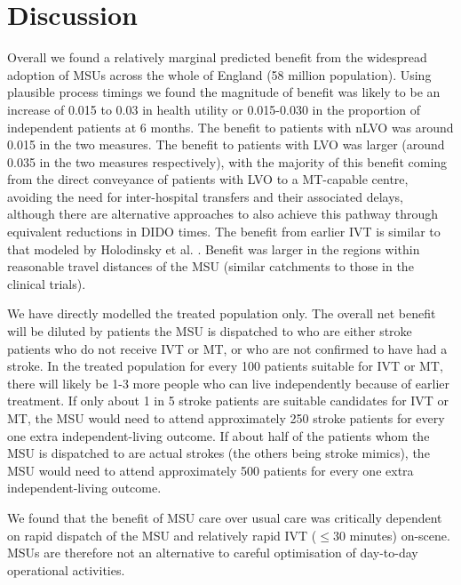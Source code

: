 \section{Discussion}



Overall we found a relatively marginal predicted benefit from the widespread adoption of MSUs across the whole of England (58 million population). Using plausible process timings we found the magnitude of benefit was likely to be an increase of 0.015 to 0.03 in health utility or 0.015-0.030 in the proportion of independent patients at 6 months. The benefit to patients with nLVO was around 0.015 in the two measures. The benefit to patients with LVO was larger (around 0.035 in the two measures respectively), with the majority of this benefit coming from the direct conveyance of patients with LVO to a MT-capable centre, avoiding the need for inter-hospital transfers and their associated delays, although there are alternative approaches to also achieve this pathway through equivalent reductions in DIDO times. The benefit from earlier IVT is similar to that modeled by Holodinsky et al. \cite{holodinsky_jessalyn_k_what_2020}. Benefit was larger in the regions within reasonable travel distances of the MSU (similar catchments to those in the clinical trials). 

We have directly modelled the treated population only. The overall net benefit will be diluted by patients the MSU is dispatched to who are either stroke patients who do not receive IVT or MT, or who are not confirmed to have had a stroke. In the treated population for every 100 patients suitable for IVT or MT, there will likely be 1-3 more people who can live independently because of earlier treatment. If only about 1 in 5 stroke patients are suitable candidates for IVT or MT, the MSU would need to attend approximately 250 stroke patients for every one extra independent-living outcome. If about half of the patients whom the MSU is dispatched to are actual strokes (the others being stroke mimics), the MSU would need to attend approximately 500 patients for every one extra independent-living outcome. 

We found that the benefit of MSU care over usual care was critically dependent on rapid dispatch of the MSU and relatively rapid IVT ($\leq$30 minutes) on-scene. MSUs are therefore not an alternative to careful optimisation of day-to-day operational activities.

